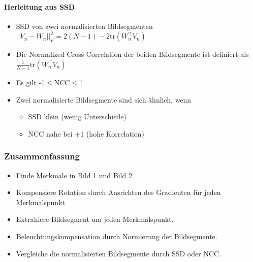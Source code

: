 \documentclass[12pt, a4paper, oneside]{article}
\begin{document}
\paragraph*{Herleitung aus SSD}
\begin{itemize}
  \item SSD von zwei normalisierten Bildsegmenten $||V_n-W_n||_F^2=2(N-1)-2\text{tr}(W_n^\top V_n)$
  \item Die Normalized Cross Correlation der beiden Bildsegmente ist definiert als $\frac{1}{N-1}\text{tr}(W_n^\top V_n)$
  \item Es gilt -1$\le$NCC$\le$1
  \item Zwei normalisierte Bildsegmente sind sich ähnlich, wenn
  \begin{itemize}
      \item SSD klein (wenig Unterschiede)
      \item NCC nahe bei +1 (hohe Korrelation)
  \end{itemize}
\end{itemize}

\subsubsection{Zusammenfassung}

\begin{itemize}
  \item Finde Merkmale in Bild 1 und Bild 2
  \item Kompensiere Rotation durch Ausrichten des Gradienten für jeden Merkmalspunkt
  \item Extrahiere Bildsegment um jeden Merkmalspunkt.
  \item Beleuchtungskompensation durch Normierung der Bildsegmente.
  \item Vergleiche die normalisierten Bildsegmente durch SSD oder NCC.
\end{itemize}
\end{document}
